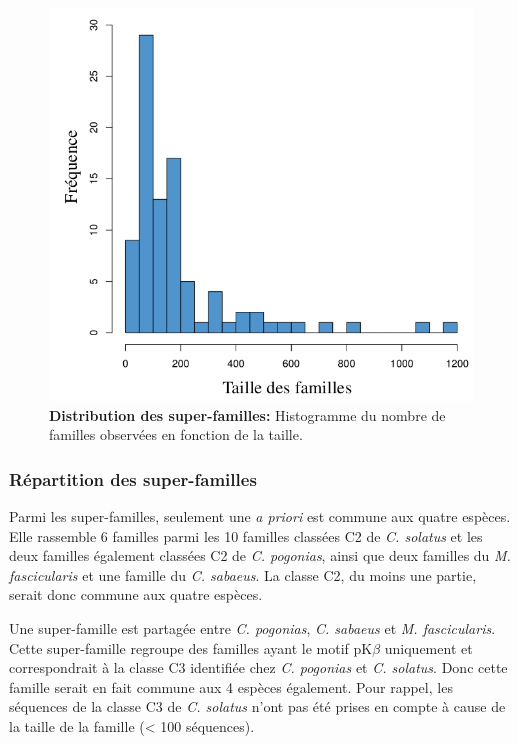 \documentclass[12pt,a4paper]{article}
\begin{document}
	\begin{figure}	
	\center
	\includegraphics[scale=0.3]{img/distribution_SF.png}
	\caption{\textbf{Distribution des super-familles:} Histogramme du nombre de familles observées en fonction de la taille. 
	\label{distribution_SF}
		} 
	\end{figure}
	
	\subsubsection{Répartition des super-familles}
	Parmi les super-familles, seulement une \textit{a priori} est commune aux quatre espèces. Elle rassemble 6 familles parmi les 10 familles classées C2 de \textit{C. solatus} et les deux familles également classées C2 de \textit{C. pogonias}, ainsi que deux familles du \textit{M. fascicularis} et une famille du \textit{C. sabaeus}. La classe C2, du moins une partie, serait donc commune aux quatre espèces.
	
	Une super-famille est partagée entre  \textit{C. pogonias},  \textit{C. sabaeus} et  \textit{M. fascicularis}. Cette super-famille regroupe des familles ayant le motif pK$\beta$ uniquement et correspondrait à la classe C3 identifiée chez \textit{C. pogonias} et \textit{C. solatus}. Donc cette famille serait en fait commune aux 4 espèces également. Pour rappel, les séquences de la  classe C3 de \textit{C. solatus} n'ont pas été prises en compte à cause de la taille de la famille (< 100 séquences).
	
\end{document}

